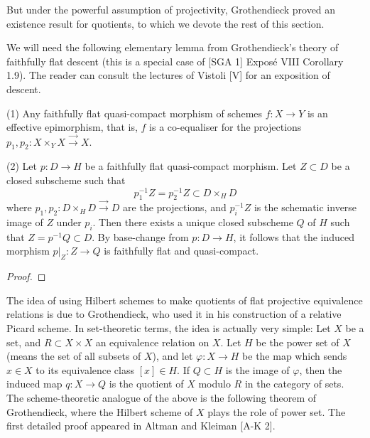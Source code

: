 But under the powerful assumption of projectivity,
Grothendieck proved an existence result for quotients, to which we
devote the rest of this section.

We will need the following elementary lemma from Grothendieck's
theory of faithfully flat descent (this is a special case of
[SGA 1] Expos\'e VIII Corollary 1.9).
The reader can consult the lectures of Vistoli
[V] for an exposition of descent.

\begin{lemma}\label{nhq-descent-subshemes}
(1) Any faithfully flat quasi-compact morphism of schemes $f : X \to Y$
is an effective epimorphism, that is, $f$ is a co-equaliser for
the projections $p_1,p_2: X\times_YX   \stackrel{\to}{\scriptstyle\to} X$.

(2) Let $p : D\to H$ be a faithfully flat quasi-compact morphism.
Let $Z \subset D$ be a closed subscheme
such that
$$p_1^{-1}Z = p_2^{-1}Z \subset D\times_HD$$
where $p_1,p_2 :  D\times_HD \stackrel{\to}{\scriptstyle\to} D$
are the projections, and $p_i^{-1}Z$ is the schematic
inverse image of $Z$ under $p_i$.
Then there exists a unique closed subscheme $Q$ of $H$
such that $Z = p^{-1}Q \subset D$. By base-change from $p : D\to H$,
it follows that the induced morphism $p|_Z : Z\to Q$
is faithfully flat and quasi-compact.
\end{lemma}

\begin{proof}
\notready
\end{proof}


The idea of using Hilbert schemes to make
quotients of flat projective equivalence relations is due to Grothendieck,
who used it in his construction of a relative Picard scheme.
In set-theoretic terms, the idea is actually very simple:
Let $X$ be a set,
and $R\subset X\times X$ an equivalence relation on $X$.
Let $H$ be the power set of $X$ (means the set of all subsets of $X$),
and let ${\varphi}: X \to H$ be the map which sends $x\in X$ to its
equivalence class $[x] \in H$. If $Q\subset H$ is the image of ${\varphi}$,
then the induced map $q: X\to Q$ is the quotient of $X$ modulo $R$ in the
category of sets. The scheme-theoretic analogue of the above is the
following theorem of Grothendieck, where the Hilbert scheme of $X$
plays the role of power set. The first detailed proof appeared in
Altman and Kleiman [A-K 2].


